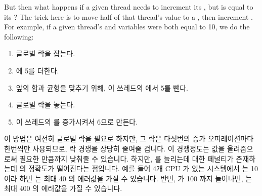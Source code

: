 But then what happens if a given thread needs to increment its
, but  is equal to its ?
The trick here is to move half of that thread's  value
to a , then increment .
For example, if a given thread's  and 
variables were both equal to 10, we do the following:
\fi

\begin{enumerate}
\item	글로벌 락을 잡는다.
\item	{} 에 5를 더한다.
\item	앞의 합과 균형을 맞추기 위해, 이 쓰레드의  에서 5를 뺀다.
\item	글로벌 락을 놓는다.
\item	이 쓰레드의  를 증가시켜서 6으로 만든다.
\end{enumerate}

이 방법은 여전히 글로벌 락을 필요로 하지만, 그 락은 다섯번의 증가
오퍼레이션마다 한번씩만 사용되므로, 락 경쟁을 상당히 줄여줄 겁니다.
이 경쟁정도는  값을 올려줌으로써 필요한 만큼까지 낮춰줄 수
있습니다.
하지만,  를 늘리는데 대한 페널티가 존재하는데 
의 정확도가 떨어진다는 점입니다.
예를 들어 4개 CPU 가 있는 시스템에서  는 10이라 하면
 는 최대 40 의 에러값을 가질 수 있습니다.
반면,  가 100 까지 늘어나면,  는 최대 400 의
에러값을 가질 수 있습니다.

